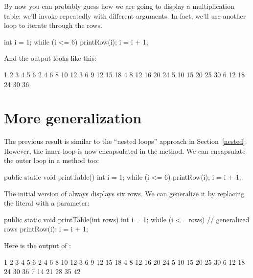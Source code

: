 By now you can probably guess how we are going to display a multiplication table: we'll invoke  repeatedly with different arguments.
In fact, we'll use another loop to iterate through the rows.

\begin{code}
int i = 1;
while (i <= 6) {
    printRow(i);
    i = i + 1;
}
\end{code}

And the output looks like this:

\begin{stdout}
   1   2   3   4   5   6
   2   4   6   8  10  12
   3   6   9  12  15  18
   4   8  12  16  20  24
   5  10  15  20  25  30
   6  12  18  24  30  36
\end{stdout}



\section{More generalization}

The previous result is similar to the ``nested loops'' approach in Section~\ref{nested}.
However, the inner loop is now encapsulated in the  method.
We can encapsulate the outer loop in a method too:

\begin{code}
public static void printTable() {
    int i = 1;
    while (i <= 6) {
        printRow(i);
        i = i + 1;
    }
}
\end{code}

The initial version of  always displays six rows.
We can generalize it by replacing the literal  with a parameter:

\begin{code}
public static void printTable(int rows) {
    int i = 1;
    while (i <= rows) {  // generalized rows
        printRow(i);
        i = i + 1;
    }
}
\end{code}

Here is the output of :

\begin{stdout}
   1   2   3   4   5   6
   2   4   6   8  10  12
   3   6   9  12  15  18
   4   8  12  16  20  24
   5  10  15  20  25  30
   6  12  18  24  30  36
   7  14  21  28  35  42
\end{stdout}

